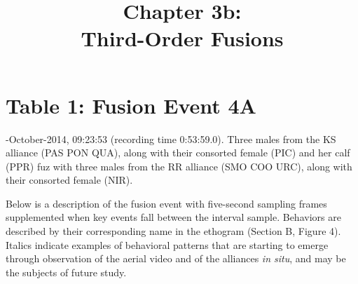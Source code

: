 \documentclass[11pt]{amsart}
\title{Chapter 3b: \\ Third-Order Fusions}
\date{}
\begin{document}
\thispagestyle{empty}
\pagestyle{empty}
\section*{Table 1: Fusion Event 4A}
-October-2014, 09:23:53 (recording time 0:53:59.0). 
Three males from the KS alliance (PAS PON QUA), along with their consorted female (PIC) and her calf (PPR) fuz with three males from the RR alliance (SMO COO URC), along with their consorted female (NIR).

\vspace{3mm}

\noindent Below is a description of the fusion event with five-second sampling frames supplemented when key events fall between the interval sample. Behaviors are described by their corresponding name in the ethogram (Section B, Figure 4). Italics indicate examples of behavioral patterns that are starting to emerge through observation of the aerial video and of the alliances \textit{in situ}, and may be the subjects of future study.

\vspace{3mm}
\end{document}
